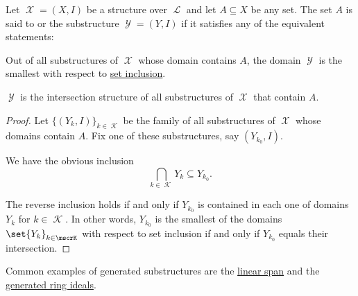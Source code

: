 \begin{definition}\label{def:first_order_generated_substructure}
  Let \( \mscrX = (X, I) \) be a structure over \( \mscrL \) and let \( A \subseteq X \) be any set. The set \( A \) is said to  or  the substructure \( \mscrY = (Y, I) \) if it satisfies any of the equivalent statements:
  \begin{thmenum}
     Out of all substructures of \( \mscrX \) whose domain contains \( A \), the domain \( \mscrY \) is the smallest with respect to \hyperref[def:subset]{set inclusion}.

     \( \mscrY \) is the intersection structure of all substructures of \( \mscrX \) that contain \( A \).
  \end{thmenum}
\end{definition}
\begin{proof}
  Let \( \{ (Y_k, I) \}_{k \in \mscrK} \) be the family of all substructures of \( \mscrX \) whose domains contain \( A \). Fix one of these substructures, say \( (Y_{k_0}, I) \).

  We have the obvious inclusion
  \begin{equation*}
    \bigcap_{k \in \mscrK} Y_k \subseteq Y_{k_0}.
  \end{equation*}

  The reverse inclusion holds if and only if \( Y_{k_0} \) is contained in each one of domains \( Y_k \) for \( k \in \mscrK \). In other words, \( Y_{k_0} \) is the smallest of the domains \( \set{ Y_k }_{k \in \mscrK} \) with respect to set inclusion if and only if \( Y_{k_0} \) equals their intersection.
\end{proof}

\begin{example}\label{ex:def:first_order_generated_substructure}
  Common examples of generated substructures are the \hyperref[def:linear_span]{linear span} and the \hyperref[def:generated_ring_ideal]{generated ring ideals}.
\end{example}

